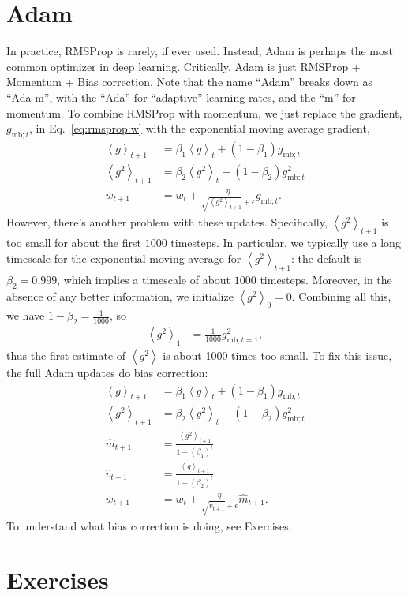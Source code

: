 \documentclass{article}
\newcommand{\bracket}[3]{\left#1 #3 \right#2}
\newcommand{\ab}{\bracket{\langle}{\rangle}}
\newcommand{\0}{\mathbf{0}}
\newcommand{\gsmbt}{g_{\text{mb}; t}}
\newcommand{\vh}{\hat{v}}
\newcommand{\mh}{\hat{m}}
\newcommand{\gssqb}{\ab{g^2}}
\newcommand{\gsb}{\ab{g}}
\begin{document}
\section{Adam}

In practice, RMSProp is rarely, if ever used.
Instead, Adam is perhaps the most common optimizer in deep learning.
Critically, Adam is just RMSProp + Momentum + Bias correction.
Note that the name ``Adam'' breaks down as ``Ada-m'', with the ``Ada'' for ``adaptive'' learning rates, and the ``m'' for momentum.
To combine RMSProp with momentum, we just replace the gradient, $\gsmbt$, in Eq.~\eqref{eq:rmsprop:w} with the exponential moving average gradient, 
\begin{align}
  \gsb_{t+1} &= \beta_1 \gsb_{t} + (1-\beta_1) \gsmbt\\
  \gssqb_{t+1} &= \beta_2 \gssqb_{t} + (1-\beta_2) \gsmbt^2\\
  w_{t+1} &= w_t + \frac{\eta}{\sqrt{\gssqb_{t+1}} + \epsilon}\gsmbt.
\end{align}
However, there's another problem with these updates. 
Specifically, $\gssqb_{t+1}$ is too small for about the first $1000$ timesteps.
In particular, we typically use a long timescale for the exponential moving average for $\gssqb_{t+1}$: the default is $\beta_2 = 0.999$, which implies a timescale of about $1000$ timesteps.
Moreover, in the absence of any better information, we initialize $\gssqb_0 = 0$.
Combining all this, we have $1-\beta_2 = \tfrac{1}{1000}$, so
\begin{align}
  \gssqb_1 &= \tfrac{1}{1000} g_{\text{mb}; t=1}^2,
\end{align}
thus the first estimate of $\gssqb$ is about 1000 times too small.
To fix this issue, the full Adam updates do bias correction:
\begin{align}
  \gsb_{t+1} &= \beta_1 \gsb_{t} + (1-\beta_1) \gsmbt\\
  \gssqb_{t+1} &= \beta_2 \gssqb_{t} + (1-\beta_2) \gsmbt^2\\
  \mh_{t+1} &= \frac{\gssqb_{t+1}}{1-(\beta_1)^t}\\
  \vh_{t+1} &= \frac{\gsb_{t+1}}{1-(\beta_2)^t}\\
  w_{t+1} &= w_t + \frac{\eta}{\sqrt{\vh_{t+1}} + \epsilon}\mh_{t+1}.
\end{align}
To understand what bias correction is doing, see Exercises.


\section{Exercises}
\end{document}
